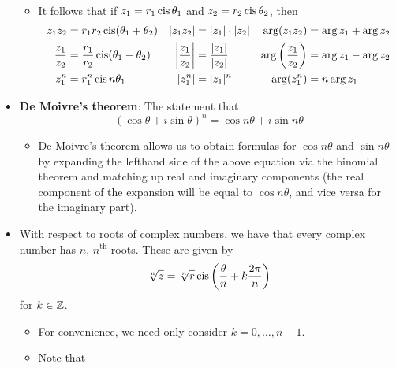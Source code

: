 \documentclass[../main.tex]{subfiles}
\begin{document}
\begin{itemize}
\begin{itemize}
\begin{align*}
        \end{align*}
        \item It follows that if $z_1=r_1\operatorname{cis}\theta_1$ and $z_2=r_2\operatorname{cis}\theta_2$, then
        \begin{align*}
            z_1z_2 &= r_1r_2\operatorname{cis}(\theta_1+\theta_2)&
            |z_1z_2| &= |z_1|\cdot|z_2|&
            \arg(z_1z_2) &= \arg z_1+\arg z_2\\
            \frac{z_1}{z_2} &= \frac{r_1}{r_2}\operatorname{cis}(\theta_1-\theta_2)&
            \left| \frac{z_1}{z_2} \right| &= \frac{|z_1|}{|z_2|}&
            \arg\left( \frac{z_1}{z_2} \right) &= \arg z_1-\arg z_2\\
            z_1^n &= r_1^n\operatorname{cis} n\theta_1&
            |z_1^n| &= |z_1|^n&
            \arg(z_1^n) &= n\arg z_1
        \end{align*}
    \end{itemize}
    \item \textbf{De Moivre's theorem}: The statement that
    \begin{equation*}
        (\cos\theta+i\sin\theta)^n = \cos n\theta+i\sin n\theta
    \end{equation*}
    \begin{itemize}
        \item De Moivre's theorem allows us to obtain formulas for $\cos n\theta$ and $\sin n\theta$ by expanding the lefthand side of the above equation via the binomial theorem and matching up real and imaginary components (the real component of the expansion will be equal to $\cos n\theta$, and vice versa for the imaginary part).
    \end{itemize}
    \item With respect to roots of complex numbers, we have that every complex number has $n$, $n^\text{th}$ roots. These are given by
    \begin{equation*}
        \sqrt[n]{z} = \sqrt[n]{r}\operatorname{cis}\left( \frac{\theta}{n}+k\frac{2\pi}{n} \right)
    \end{equation*}
    for $k\in\mathbb{Z}$.
    \begin{itemize}
        \item For convenience, we need only consider $k=0,\dots,n-1$.
        \item Note that 

\end{itemize}
\end{itemize}
\end{document}
